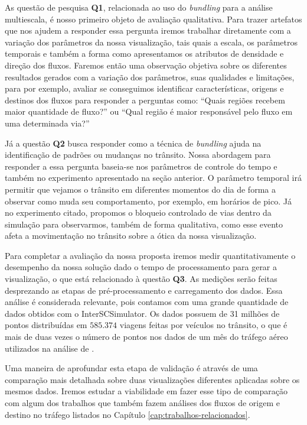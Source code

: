   As questão de pesquisa \textbf{Q1}, relacionada ao uso do \emph{bundling}
para a análise multiescala, é nosso primeiro objeto de avaliação qualitativa.
Para trazer artefatos que nos ajudem a responder essa pergunta iremos trabalhar
diretamente com a variação dos parâmetros da nossa visualização, tais quais a
escala, os parâmetros temporais e também a forma como apresentamos os atributos
de densidade e direção dos fluxos. Faremos então uma observação objetiva sobre
os diferentes resultados gerados com a variação dos parâmetros, suas qualidades
e limitações, para por exemplo, avaliar se conseguimos identificar
características, origens e destinos dos fluxos para responder a perguntas como:
``Quais regiões recebem maior quantidade de fluxo?'' ou ``Qual região é maior
responsável pelo fluxo em uma determinada via?''

  Já a questão \textbf{Q2} busca responder como a técnica de \emph{bundling}
ajuda na identificação de padrões ou mudanças no trânsito. Nossa abordagem para
responder a essa pergunta baseia-se nos parâmetros de controle do tempo e
também no experimento apresentado na seção anterior. O parâmetro temporal irá
permitir que vejamos o trânsito em diferentes momentos do dia de forma a
observar como muda seu comportamento, por exemplo, em horários de pico. Já no
experimento citado, propomos o bloqueio controlado de vias dentro da simulação
para observarmos, também de forma qualitativa, como esse evento afeta a
movimentação no trânsito sobre a ótica da nossa visualização.

  Para completar a avaliação da nossa proposta iremos medir quantitativamente o
desempenho da nossa solução dado o tempo de processamento para gerar a
visualização, o que está relacionado à questão \textbf{Q3}. As medições serão
feitas desprezando as etapas de pré-processamento e carregamento dos dados.
Essa análise é considerada relevante, pois contamos com uma grande quantidade
de dados obtidos com o InterSCSimulator. Os dados possuem de 31 milhões de
pontos distribuídas em $585.374$ viagens feitas por veículos no trânsito, o que
é mais de duas vezes o número de pontos nos dados de um mês do tráfego aéreo
utilizados na análise de \citet{Klein2014}.

 Uma maneira de aprofundar esta etapa de validação é através de uma comparação
mais detalhada sobre duas visualizações diferentes aplicadas sobre os mesmos
dados. Iremos estudar a viabilidade em fazer esse tipo de comparação com
algum dos trabalhos que também fazem análises dos fluxos de origem e destino no
tráfego listados no Capítulo \ref{cap:trabalhos-relacionados}.
